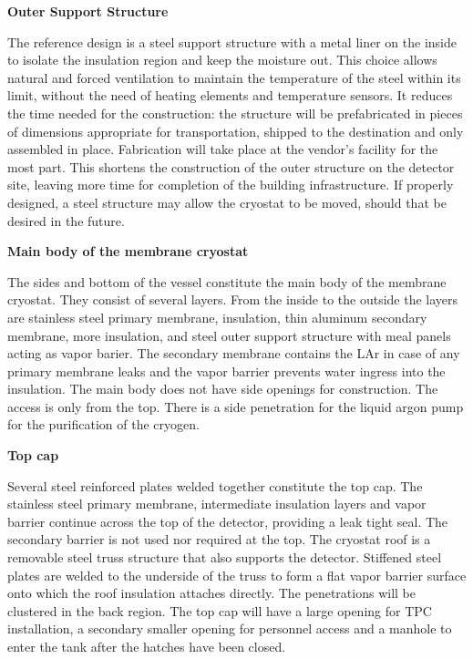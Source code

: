 \textbf{Outer Support Structure}

The reference design is a steel support structure with a metal liner on the inside to isolate the insulation region and keep the moisture out. This choice allows natural and forced ventilation to maintain the temperature of the steel within its limit, without the need of heating elements and temperature sensors. It reduces the time needed for the construction: the structure will be prefabricated in pieces of dimensions appropriate for transportation, shipped to the destination and only assembled in place. Fabrication will take place at the vendor’s facility for the most part. This shortens the construction of the outer structure on the detector site, leaving more time for completion of the building infrastructure. If properly designed, a steel structure may allow the cryostat to be moved, should that be desired in the future.

\textbf{Main body of the membrane cryostat}

The sides and bottom of the vessel constitute the main body of the membrane cryostat. They consist of several layers. From the inside to the outside the layers are stainless steel primary membrane, insulation, thin aluminum secondary membrane, more insulation, and steel outer support structure with meal panels acting as vapor barier. The secondary membrane contains the LAr in case of any primary membrane leaks and the vapor barrier prevents water ingress into the insulation. The main body does not have side openings for construction. The access is only from the top. There is a side penetration for the liquid argon pump for the purification of the cryogen.

\textbf{Top cap}

Several steel reinforced plates welded together constitute the top cap. The stainless steel primary 
membrane, intermediate insulation layers and vapor barrier continue across the top of the detector, 
providing a leak tight seal. The secondary barrier is not used nor required at the top. The cryostat roof is 
a removable steel truss structure that also supports the detector. Stiffened steel plates are welded to the 
underside of the truss to form a flat vapor barrier surface onto which the roof insulation attaches directly. 
The penetrations will be clustered in the back region. The top cap will have a large opening for TPC 
installation, a secondary smaller opening for personnel access and a manhole to enter the tank after the 
hatches have been closed.

